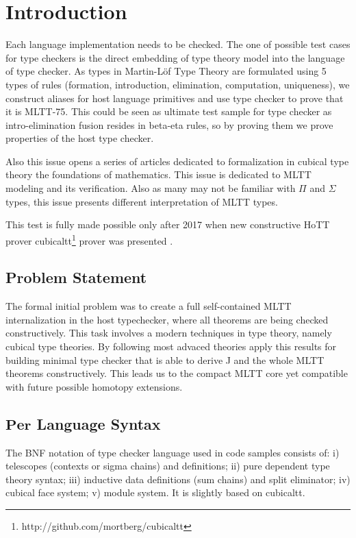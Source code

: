 \documentclass{article}
\theoremstyle{definition}
\begin{document}
\tableofcontents

\section*{Introduction}

Each language implementation needs to be checked. The one of possible test cases
for type checkers is the direct embedding of type theory model into the language of type checker.
As types in Martin-Löf Type Theory \cite{Lof72,Lof84} are formulated using 5 types of rules (formation,
introduction, elimination, computation, uniqueness), we construct aliases
for host language primitives and use type checker to prove that it is MLTT-75.
This could be seen as ultimate test sample for type checker as
intro-elimination fusion resides in beta-eta rules, so by proving them
we prove properties of the host type checker.

Also this issue opens a series of articles dedicated to formalization in
cubical type theory the foundations of mathematics. This issue is dedicated
to MLTT modeling and its verification. Also as many may not be familiar with
$\Pi$ and $\Sigma$ types, this issue presents different interpretation of MLTT types.

This test is fully made possible only after 2017 when new constructive HoTT \cite{HoTT13} prover cubicaltt\footnote{http://github.com/mortberg/cubicaltt}
prover was presented \cite{Mortberg17}.

\subsection*{Problem Statement}

The formal initial problem was to create a full self-contained MLTT internalization in the host typechecker,
where all theorems are being checked constructively. This task involves a modern techniques in type theory,
namely cubical type theories. By following most advaced theories apply this results for building minimal
type checker that is able to derive J and the whole MLTT theorems constructively. This leads us to the
compact MLTT core yet compatible with future possible homotopy extensions.

\subsection*{$\mathbf{Per}$ Language Syntax}

The BNF notation of type checker language used in code samples consists of:
i) telescopes (contexts or sigma chains) and definitions;
ii) pure dependent type theory syntax;
iii) inductive data definitions (sum chains) and split eliminator;
iv) cubical face system;
v) module system. It is slightly based on cubicaltt.
\end{document}
